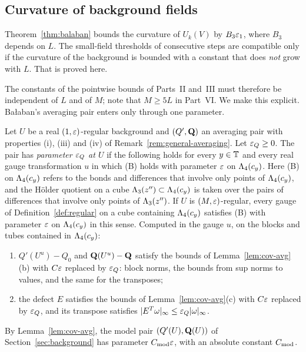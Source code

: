\subsection{Curvature of background fields}\label{ss:31.2}

Theorem~\ref{thm:balaban} bounds the curvature of $U_k(V)$ by $B_3\varepsilon_1$, where $B_3$ depends on $L$. The small-field thresholds of consecutive steps are compatible only if the curvature of the background is bounded with a constant that does \emph{not} grow with $L$. That is proved here.

The constants of the pointwise bounds of Parts~II and~III must therefore be independent of $L$ and of $M$; note that $M\ge5L$ in Part~VI. We make this explicit. Ba\l aban's averaging pair enters only through one parameter.

\begin{definition}\label{def:avg-parameter}
Let $U$ be a real $(1,\varepsilon)$-regular background and $(Q',\mathbf Q)$ an averaging pair with properties (i), (iii) and (iv) of Remark~\ref{rem:general-averaging}. Let $\varepsilon_Q\ge0$. The pair has \emph{parameter $\varepsilon_Q$ at $U$} if the following holds for every $y\in\mathbb T$ and every real gauge transformation $u$ in which (B) holds with parameter $\varepsilon$ on $\Lambda_4(c_y)$. Here (B) on $\Lambda_4(c_y)$ refers to the bonds and differences that involve only points of $\Lambda_4(c_y)$, and the H\"older quotient on a cube $\Lambda_3(z'')\subset\Lambda_4(c_y)$ is taken over the pairs of differences that involve only points of $\Lambda_3(z'')$. If $U$ is $(M,\varepsilon)$-regular, every gauge of Definition~\ref{def:regular} on a cube containing $\Lambda_4(c_y)$ satisfies (B) with parameter $\varepsilon$ on $\Lambda_4(c_y)$ in this sense. Computed in the gauge $u$, on the blocks and tubes contained in $\Lambda_4(c_y)$:
\begin{enumerate}[label=(\alph*)]
\item $Q'(U^u)-Q_0$ and $\mathbf Q(U^u)-\mathbf Q$ satisfy the bounds of Lemma~\ref{lem:cov-avg}(b) with $C\varepsilon$ replaced by $\varepsilon_Q$: block norms, the bounds from sup norms to values, and the same for the transposes;
\item the defect $E$ satisfies the bounds of Lemma~\ref{lem:cov-avg}(c) with $C\varepsilon$ replaced by $\varepsilon_Q$, and its transpose satisfies $|E^T\omega|_\infty\le\varepsilon_Q|\omega|_\infty$.
\end{enumerate}
\end{definition}

By Lemma~\ref{lem:cov-avg}, the model pair $(Q'(U),\mathbf Q(U))$ of Section~\ref{sec:background} has parameter $C_{\rm mod}\varepsilon$, with an absolute constant $C_{\rm mod}$.

